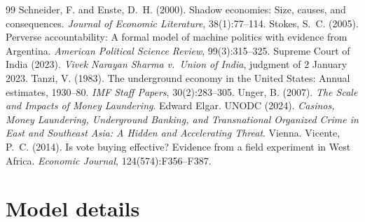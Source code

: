 \documentclass[11pt]{article}
\theoremstyle{definition}
\theoremstyle{remark}
\begin{document}
\begin{thebibliography}{99}
 Schneider, F. and Enste, D.~H. (2000). Shadow economies: Size, causes, and consequences. \textit{Journal of Economic Literature}, 38(1):77--114.
 Stokes, S.~C. (2005). Perverse accountability: A formal model of machine politics with evidence from Argentina. \textit{American Political Science Review}, 99(3):315--325.
 Supreme Court of India (2023). \textit{Vivek Narayan Sharma v.\ Union of India}, judgment of 2 January 2023.
 Tanzi, V. (1983). The underground economy in the United States: Annual estimates, 1930--80. \textit{IMF Staff Papers}, 30(2):283--305.
 Unger, B. (2007). \textit{The Scale and Impacts of Money Laundering}. Edward Elgar.
 UNODC (2024). \textit{Casinos, Money Laundering, Underground Banking, and Transnational Organized Crime in East and Southeast Asia: A Hidden and Accelerating Threat}. Vienna.
 Vicente, P.~C. (2014). Is vote buying effective? Evidence from a field experiment in West Africa. \textit{Economic Journal}, 124(574):F356--F387.
\end{thebibliography}

\appendix
\renewcommand{\thetable}{A\arabic{table}}\setcounter{table}{0}
\section{Model details}\label{app:model}
\end{document}
